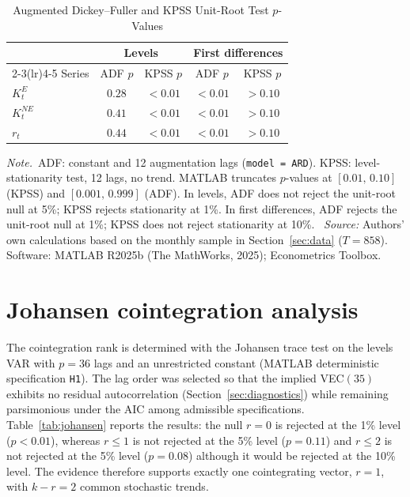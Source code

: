 \documentclass[12pt]{article}
\numberwithin{equation}{section}
\numberwithin{table}{section}
\theoremstyle{definition}
\newcommand{\KE}{K^{E}}
\newcommand{\KNE}{K^{NE}}
\newcommand{\tabnote}{\par\addvspace{0.4em}\noindent\emph{Note.}}
\newcommand{\tabsource}{\ \textit{Source:} Authors' own calculations based on
the monthly sample in Section~\ref{sec:data} ($T=858$). Software: MATLAB
R2025b (The MathWorks, 2025); Econometrics Toolbox.}
\begin{document}
\begin{table}[t]
\centering
\caption{Augmented Dickey--Fuller and KPSS Unit-Root Test $p$-Values}
\label{tab:unitroot}
\begin{tabular}{lcccc}
\toprule
& \multicolumn{2}{c}{Levels} & \multicolumn{2}{c}{First differences} \\
\cmidrule(lr){2-3}\cmidrule(lr){4-5}
Series & ADF $p$ & KPSS $p$ & ADF $p$ & KPSS $p$ \\
\midrule
$\KE_t$  & $0.28$ & $<0.01$ & $<0.01$ & $>0.10$ \\
$\KNE_t$ & $0.41$ & $<0.01$ & $<0.01$ & $>0.10$ \\
$r_t$    & $0.44$ & $<0.01$ & $<0.01$ & $>0.10$ \\
\bottomrule
\end{tabular}
\tabnote\ ADF: constant and 12 augmentation lags (\texttt{model = ARD}).
KPSS: level-stationarity test, 12 lags, no trend. MATLAB truncates
$p$-values at $[0.01,\,0.10]$ (KPSS) and $[0.001,\,0.999]$ (ADF). In levels,
ADF does not reject the unit-root null at 5\%; KPSS rejects stationarity at
1\%. In first differences, ADF rejects the unit-root null at 1\%; KPSS does
not reject stationarity at 10\%.
\tabsource
\end{table}

\section{Johansen cointegration analysis}
\label{sec:johansen}

The cointegration rank is determined with the Johansen trace test
\citep{Johansen1988} on the levels VAR with $p=36$ lags and an unrestricted
constant (MATLAB deterministic specification \texttt{H1}). The lag order was
selected so that the implied VEC$(35)$ exhibits no residual autocorrelation
(Section~\ref{sec:diagnostics}) while remaining parsimonious under the AIC
among admissible specifications. Table~\ref{tab:johansen} reports the
results: the null $r=0$ is rejected at the 1\% level ($p<0.01$), whereas
$r\le 1$ is not rejected at the 5\% level ($p=0.11$) and $r\le 2$ is not
rejected at the 5\% level ($p=0.08$) although it would be rejected at the
10\% level. The evidence therefore supports exactly one cointegrating vector,
$r=1$, with $k-r=2$ common stochastic trends.
\end{document}
